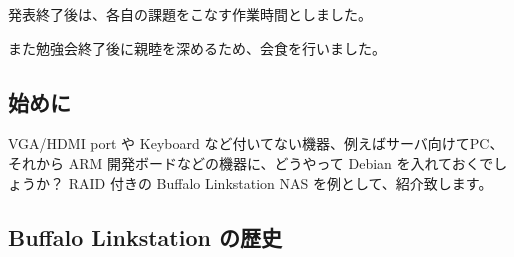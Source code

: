 \documentclass[mingoth,a4paper]{jsarticle}
\begin{document}
発表終了後は、各自の課題をこなす作業時間としました。

また勉強会終了後に親睦を深めるため、会食を行いました。



\subsection{始めに}
VGA/HDMI port や Keyboard など付いてない機器、例えばサーバ向けてPC、それから ARM 開発ボードなどの機器に、どうやって Debian を入れておくでしょうか？
RAID 付きの Buffalo Linkstation NAS を例として、紹介致します。

\subsection{Buffalo Linkstation の歴史}
\end{document}
